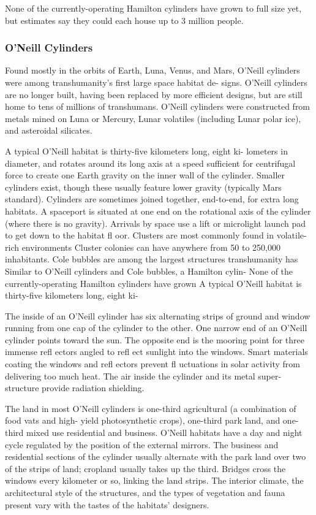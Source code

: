 None of the currently-operating Hamilton cylinders have grown 
to full size yet, but estimates say they could each house up to 3 
million people.

\subsubsection{O'Neill Cylinders}

Found mostly in the orbits of Earth, Luna, Venus, and Mars, O'Neill 
cylinders were among transhumanity's first large space habitat de-
signs. O'Neill cylinders are no longer built, having been replaced 
by more efficient designs, but are still home to tens of millions of 
transhumans. O'Neill cylinders were constructed from metals mined 
on Luna or Mercury, Lunar volatiles (including Lunar polar ice), 
and asteroidal silicates.

A typical O'Neill habitat is thirty-five kilometers long, eight ki-
lometers in diameter, and rotates around its long axis at a speed 
sufficient for centrifugal force to create one Earth gravity on the 
inner wall of the cylinder. Smaller cylinders exist, though these 
usually feature lower gravity (typically Mars standard). Cylinders 
are sometimes joined together, end-to-end, for extra long habitats. 
A spaceport is situated at one end on the rotational axis of the 
cylinder (where there is no gravity). Arrivals by space use a lift or 
microlight launch pad to get down to the habitat fl oor.
Clusters are most commonly found in volatile-rich environments 
Cluster colonies can have anywhere from 50 to 250,000 inhabitants.
Cole bubbles are among the largest structures transhumanity has 
Similar to O'Neill cylinders and Cole bubbles, a Hamilton cylin-
None of the currently-operating Hamilton cylinders have grown 
A typical O'Neill habitat is thirty-five kilometers long, eight ki-

The inside of an O'Neill cylinder has six alternating 
strips of ground and window running from one cap 
of the cylinder to the other. One narrow end of an 
O'Neill cylinder points toward the sun. The opposite 
end is the mooring point for three immense refl ectors 
angled to refl ect sunlight into the windows. Smart 
materials coating the windows and refl ectors prevent 
fl uctuations in solar activity from delivering too much 
heat. The air inside the cylinder and its metal super-
structure provide radiation shielding.

The land in most O'Neill cylinders is one-third 
agricultural (a combination of food vats and high-
yield photosynthetic crops), one-third park land, and 
one-third mixed use residential and business. O'Neill 
habitats have a day and night cycle regulated by the 
position of the external mirrors. The business and 
residential sections of the cylinder usually alternate 
with the park land over two of the strips of land; 
cropland usually takes up the third. Bridges cross 
the windows every kilometer or so, linking the land 
strips. The interior climate, the architectural style of 
the structures, and the types of vegetation and fauna 
present vary with the tastes of the habitats' designers.

